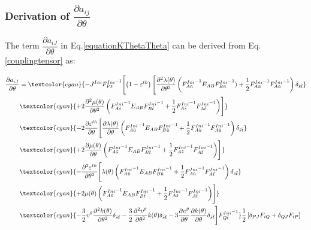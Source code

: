 \documentclass[oneside,11pt,times]{book}
\begin{document}
\subsubsection{Derivation of $\dfrac{\partial{a_{ij}}}{\partial{\theta}}$}

The term $\dfrac{\partial{a_{iJ}}}{\partial{\theta}}$ in Eq.\eqref{equationKThetaTheta} can be derived from Eq.\eqref{couplingtensor} as:

\begin{equation}
\begin{aligned}
\centering
\dfrac{\partial{a_{iJ}}}{\partial{\theta}}&=\textcolor{cyan}{
-J^{Ini}{{F}^{Ini}_{P\tilde{s}}}^{-1}\Biggl[\left(1-\varepsilon^{th}\right)\Biggl[\frac{\partial^2\lambda (\theta)}{\partial \theta^2} \left({{F}^{Ini}_{A\tilde{u}}}^{-1}{E}_{AB}{{F}^{Ini}_{B\tilde{u}}}^{-1})+\frac{1}{2}{{F}^{Ini}_{A\tilde{u}}}^{-1}{{F}^{Ini}_{A\tilde{u}}}^{-1}\right)\delta_{\tilde{s}\tilde{t}}}\\&
\textcolor{cyan}{+2\frac{\partial^2\mu (\theta)}{\partial \theta^2} \left({{F}^{Ini}_{A\tilde{s}}}^{-1}{E}_{AB}{{F}^{Ini}_{B\tilde{t}}}^{-1}+\frac{1}{2}{{F}^{Ini}_{A\tilde{s}}}^{-1}{{F}^{Ini}_{A\tilde{t}}}^{-1}\right)\Biggr]}
\\&\textcolor{cyan}{-2\frac{\partial\varepsilon^{th}}{\partial \theta}\Biggl[\frac{\partial\lambda (\theta)}{\partial \theta} \left({{F}^{Ini}_{A\tilde{u}}}^{-1}{E}_{AB}{{F}^{Ini}_{B\tilde{u}}}^{-1}+\frac{1}{2}{{F}^{Ini}_{A\tilde{u}}}^{-1}{{F}^{Ini}_{A\tilde{u}}}^{-1}\right)\delta_{\tilde{s}\tilde{t}}}\\&
\textcolor{cyan}{+2\frac{\partial\mu (\theta)}{\partial \theta} \left({{F}^{Ini}_{A\tilde{s}}}^{-1}{E}_{AB}{{F}^{Ini}_{B\tilde{t}}}^{-1}+\frac{1}{2}{{F}^{Ini}_{A\tilde{s}}}^{-1}{{F}^{Ini}_{A\tilde{t}}}^{-1}\right)\Biggr]}
\\&\textcolor{cyan}{-\frac{\partial^2\varepsilon^{th}}{\partial \theta^2}\Biggl[\lambda (\theta) \left({{F}^{Ini}_{A\tilde{u}}}^{-1}{E}_{AB}{{F}^{Ini}_{B\tilde{u}}}^{-1}+\frac{1}{2}{{F}^{Ini}_{A\tilde{u}}}^{-1}{{F}^{Ini}_{A\tilde{t}}}^{-1}\right)\delta_{\tilde{s}\tilde{t}}}\\&
\textcolor{cyan}{+2\mu (\theta) \left({{F}^{Ini}_{A\tilde{s}}}^{-1}{E}_{AB}{{F}^{Ini}_{B\tilde{t}}}^{-1}+\frac{1}{2}{{F}^{Ini}_{A\tilde{s}}}^{-1}{{F}^{Ini}_{A\tilde{t}}}^{-1}\right)\Biggr]}\\
&\textcolor{cyan}{-\frac{3}{2}{\upsilon^{\theta}}\frac{\partial ^2 k(\theta)}{\partial\theta^2}\delta_{\tilde{s}\tilde{t}}-\frac{3}{2}
\frac{\partial{^2\upsilon^{\theta}}}{\partial \theta^2}k(\theta)\delta_{\tilde{s}\tilde{t}}-3
\frac{\partial{\upsilon^{\theta}}}{\partial \theta}\frac{\partial k(\theta)}{\partial\theta}\delta_{\tilde{s}\tilde{t}}\Biggr]{{F}^{Ini}_{Q\tilde{t}}}^{-1}}\frac{1}{2}\left[\delta_{PJ}F_{iQ}+\delta_{QJ}F_{iP}\right]
\end{aligned}
\end{equation}
\end{document}

